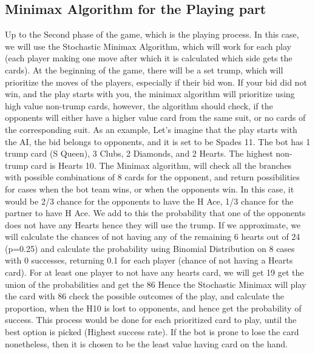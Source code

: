 \subsection{Minimax Algorithm for the Playing part}
\hspace{\parindent} Up to the Second phase of the game, which is the playing process.
In this case, we will use
the Stochastic Minimax Algorithm, which will work for each play (each player making one
move after which it is calculated which side gets the cards). At the beginning of the
game, there will be a set trump, which will prioritize the moves of the players,
especially if their bid won. If your bid did not win, and the play starts with you,
the minimax algorithm will prioritize using high value non-trump cards, however, the
algorithm should check, if the opponents will either have a higher value card from the
same suit, or no cards of the corresponding suit. As an example, Let’s imagine that the
play starts with the AI, the bid belongs to opponents, and it is set to be Spades 11.
The bot has 1 trump card (S Queen), 3 Clubs, 2 Diamonds, and 2 Hearts. The highest
non-trump card is Hearts 10. The Minimax algorithm, will check all the branches with
possible combinations of 8 cards for the opponent, and return possibilities for cases
when the bot team wins, or when the opponents win. In this case, it would be 2/3 chance
for the opponents to have the H Ace, 1/3 chance for the partner to have H Ace. We add
to this the probability that one of the opponents does not have any Hearts hence they
will use the trump. If we approximate, we will calculate the chances of not having any
of the remaining 6 hearts out of 24 (p=0.25) and calculate the probability using Binomial
Distribution on 8 cases with 0 successes, returning 0.1 for each player (chance of not
having a Hearts card). For at least one player to not have any hearts card, we will get
19%
get the union of the probabilities and get the 86%
Hence the Stochastic Minimax will play
the card with 86%
check the possible outcomes of the play, and calculate the proportion, when the H10 is
lost to opponents, and hence get the probability of success. This process would be done
for each prioritized card to play, until the best option is picked (Highest success rate).
If the bot is prone to lose the card nonetheless, then it is chosen to be the least value
having card on the hand.